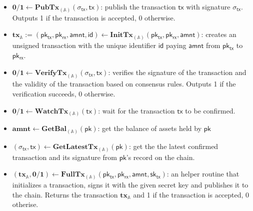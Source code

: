 \documentclass{article}      	%
\begin{document}
\begin{itemize}[topsep=0pt, itemsep=0pt, leftmargin=2em]
    \item $\mathbf{0/1} \gets \mathbf{PubTx}_{(\mathbb{A})}(\sigma_{\mathsf{tx}}, \mathsf{tx})$: publish the transaction $\mathsf{tx}$ with signature $\sigma_{\mathsf{tx}}$. Outputs 1 if the transaction is accepted, 0 otherwise.
    \item $\mathbf{tx}_{\mathbb{A}} := (\mathsf{pk_{tx}}, \mathsf{pk_{rx}}, \mathsf{amnt}, \mathsf{id})  \gets \mathbf{InitTx}_{(\mathbb{A})}(\mathsf{pk_{tx}}, \mathsf{pk_{rx}}, \mathsf{amnt})$: creates an unsigned transaction with the unique identifier $\mathsf{id}$ paying $\mathsf{amnt}$ from $\mathsf{pk_{tx}}$ to $\mathsf{pk_{rx}}$.
    \item $\mathbf{0/1} \gets \mathbf{VerifyTx}_{(\mathbb{A})}(\sigma_{\mathsf{tx}}, \mathsf{tx})$: verifies the signature of the transaction and the validity of the transaction based on consensus rules. Outputs 1 if the verification succeeds, 0 otherwise.
    \item $\mathbf{0/1} \gets \mathbf{WatchTx}_{(\mathbb{A})}(\mathsf{tx})$: wait for the transaction $\mathsf{tx}$ to be confirmed.
    \item $\mathbf{amnt} \gets \mathbf{GetBal}_{(\mathbb{A})}(\mathsf{pk})$: get the balance of assets held by $\mathsf{pk}$
    \item $(\sigma_{\mathsf{tx}}, \mathsf{tx}) \gets \mathbf{GetLatestTx}_{(\mathbb{A})}(\mathsf{pk})$: get the the latest confirmed transaction and its signature from $\mathsf{pk}$'s record on the chain.
    \item $(\mathbf{tx}_{\mathbb{A}}, \mathbf{0/1})  \gets \mathbf{FullTx}_{(\mathbb{A})}(\mathsf{pk_{tx}}, \mathsf{pk_{rx}}, \mathsf{amnt}, \mathsf{sk_{tx}})$: an helper routine that initializes a transaction, signs it with the given secret key and publishes it to the chain. Returns the transaction $\mathbf{tx}_{\mathbb{A}}$ and 1 if the transaction is accepted, 0 otherise.
\end{itemize}
\end{document}

